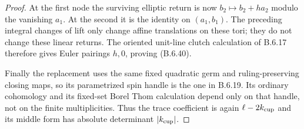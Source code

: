 \begin{proof}
At the first node the surviving elliptic return is now
$b_2\mapsto b_2+h a_2$ modulo the vanishing $a_1$.
At the second it is the identity on $(a_1,b_1)$.
The preceding integral changes of lift only change
affine translations on these tori; they do not change
these linear returns.  The oriented unit-line clutch
calculation of B.6.17 therefore gives Euler pairings
$h,0$, proving (B.6.40).

Finally the replacement uses the same fixed quadratic
germ and ruling-preserving closing maps, so its
parametrized spin handle is the one in B.6.19.
Its ordinary cohomology and its fixed-set Borel Thom
calculation depend only on that handle, not on the
finite multiplicities.  Thus the trace coefficient
is again $\ell-2k_{\rm cup}$ and its middle form has
absolute determinant $|k_{\rm cup}|$.
\end{proof}



